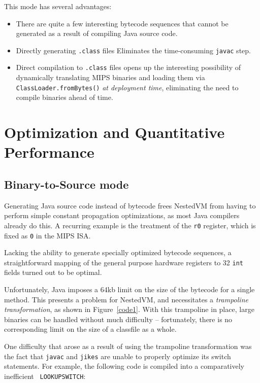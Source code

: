 \documentclass{acmconf}
\begin{document}
This mode has several advantages:

\begin{itemize}
      
\item There are quite a few interesting bytecode sequences that cannot
      be generated as a result of compiling Java source code.

\item Directly generating {\tt .class} files Eliminates the
      time-consuming {\tt javac} step.

\item Direct compilation to {\tt .class} files opens up the
      interesting possibility of dynamically translating MIPS binaries
      and loading them via {\tt ClassLoader.fromBytes()} {\it at
      deployment time}, eliminating the need to compile binaries ahead
      of time.

\end{itemize}

\section{Optimization and Quantitative Performance}

\subsection{Binary-to-Source mode}

Generating Java source code instead of bytecode frees NestedVM from
having to perform simple constant propagation optimizations, as most
Java compilers already do this.  A recurring example is the treatment
of the {\tt r0} register, which is fixed as {\tt 0} in the MIPS ISA.

Lacking the ability to generate specially optimized bytecode
sequences, a straightforward mapping of the general purpose hardware
registers to 32 {\tt int} fields turned out to be optimal.



Unfortunately, Java imposes a 64kb limit on the size of the bytecode
for a single method.  This presents a problem for NestedVM, and
necessitates a {\it trampoline transformation}, as shown in
Figure~\ref{code1}.  With this trampoline in place, large binaries can
be handled without much difficulty -- fortunately, there is no
corresponding limit on the size of a classfile as a whole.

One difficulty that arose as a result of using the trampoline
transformation was the fact that {\tt javac} and {\tt jikes} are
unable to properly optimize its switch statements.  For example, the
following code is compiled into a comparatively inefficient {\tt
LOOKUPSWITCH}:
\end{document}

